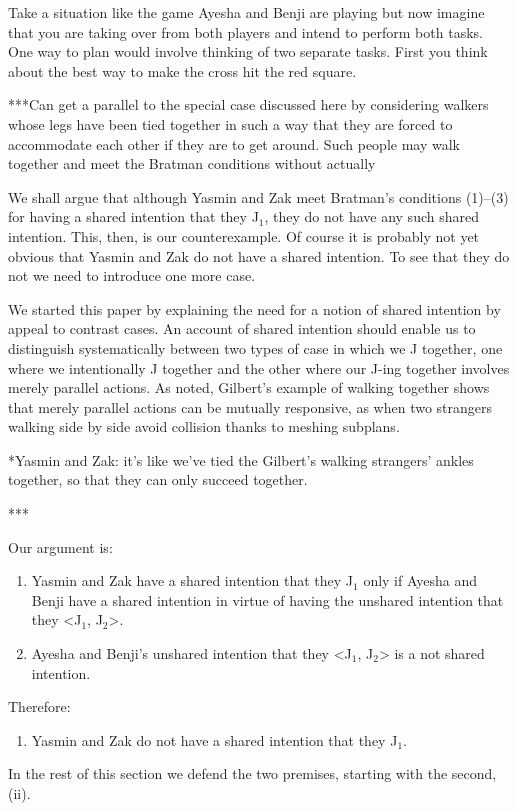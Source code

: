 \documentclass[12pt,\papersize]{extarticle}
\begin{document}
Take a situation like the game Ayesha and Benji are playing but now imagine that you are taking over from both players and intend to perform both tasks. 
One way to plan would involve thinking of two separate tasks.
First you think about the best way to make the cross hit the red square.



%


 

***Can get a parallel to the special case discussed here by considering walkers whose legs have been tied together in such a way that they are forced to accommodate each other if they are to get around.  Such people may walk together and meet the Bratman conditions without actually 




We shall argue that although Yasmin and Zak meet Bratman's conditions (1)--(3) for having a shared intention that they J$_1$, they do not have any such shared intention.
This, then, is our counterexample.
Of course it is probably not yet obvious that Yasmin and Zak do not have a shared intention.
To see that they do not we need to introduce one more case.

We started this paper by explaining the need for a notion of shared intention by appeal to contrast cases. 
An account of shared intention should enable us to  distinguish systematically between two types of case in which we J together, one where we intentionally J together and the other where  our J-ing together involves  merely parallel actions.
As noted, Gilbert's example of walking together shows that merely parallel actions can be mutually responsive, as when two strangers walking side by side avoid collision thanks to meshing subplans.



*Yasmin and Zak: it's like we've tied the Gilbert's walking strangers' ankles together, so that they can only succeed together.





***


Our argument is:
\begin{enumerate}[label=\roman*]
\item Yasmin and Zak have a shared intention that they J$_1$ only if Ayesha and Benji have a shared intention in virtue of having the 
 unshared intention that they <J$_1$, J$_2$>.
\item Ayesha and Benji's unshared intention that they <J$_1$, J$_2$> is a not shared intention.
\end{enumerate}
%
Therefore:
%
\begin{enumerate}[resume,label=\roman*]
\item Yasmin and Zak do not have a shared intention that they J$_1$.
\end{enumerate}
%
In the rest of this section we defend the two premises, starting with the second, (ii).
\end{document}
